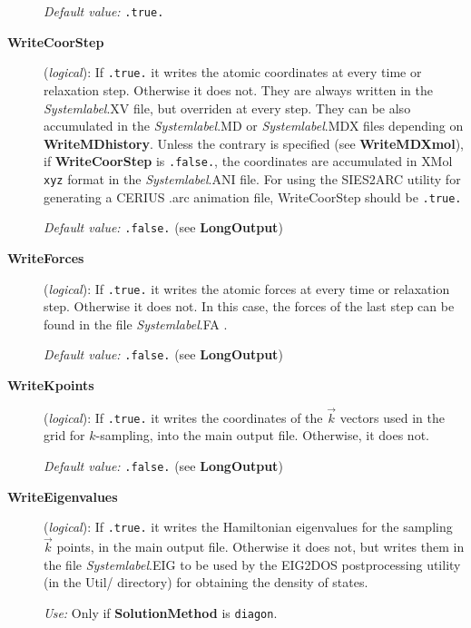 \begin{description}
{\it Default value:} {\tt .true.}

 
\item[{\bf WriteCoorStep}] ({\it logical}):
If {\tt .true.} it writes the atomic coordinates at every 
time or relaxation step. Otherwise it does not. They are
always written in the {\it Systemlabel}.XV file, but
overriden at every step. They can be also accumulated
in the {\it Systemlabel}.MD or {\it Systemlabel}.MDX files
depending on {\bf WriteMDhistory}. Unless the contrary is specified
(see {\bf WriteMDXmol}), if {\bf WriteCoorStep} is {\tt .false.}, 
the coordinates are accumulated in {\sc XMol} {\tt xyz} format in the
{\it Systemlabel}.ANI file.
For using the SIES2ARC utility
for generating a CERIUS .arc animation file,
WriteCoorStep should be {\tt .true.}

{\it Default value:} {\tt .false.} (see {\bf LongOutput})
 
 
\item[{\bf WriteForces}] ({\it logical}):
If {\tt .true.} it writes the atomic forces at every
time or relaxation step. Otherwise it does not. In this case,
the forces of the last step can be found in the file {\it Systemlabel}.FA .
 
{\it Default value:} {\tt .false.} (see {\bf LongOutput})

\item[{\bf WriteKpoints}] ({\it logical}):
If {\tt .true.} it writes the coordinates of the $\vec k$ vectors
used in the grid for $k$-sampling, into the main output file.
Otherwise, it does not.

{\it Default value:} {\tt .false.} (see {\bf LongOutput})

 
\item[{\bf WriteEigenvalues}] ({\it logical}):
If {\tt .true.} it writes the Hamiltonian eigenvalues for the sampling
$\vec k$ points, in the main output file.
Otherwise it does not, but writes them in the file {\it Systemlabel}.EIG
to be used by the EIG2DOS postprocessing utility 
(in the Util/ directory) for obtaining the density of
states.

{\it Use:} Only if {\bf SolutionMethod} is {\tt diagon}.
 

\end{description}
